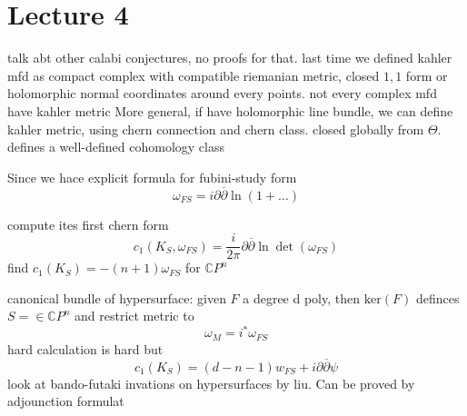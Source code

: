 % 
\section{Lecture 4} %
\label{sec:lecture_4}
talk abt other calabi conjectures, no proofs for that.
last time we defined kahler mfd as compact complex with compatible riemanian metric, closed $1,1$ form
or holomorphic normal coordinates around every points. not every complex mfd have kahler metric
More general, if have holomorphic line bundle, we can define kahler metric, using chern connection and chern class. closed globally from $\Theta$. defines a well-defined cohomology class 

Since we hace explicit formula for fubini-study form
\begin{equation}
    \omega_{FS} = i \partial \overline{\partial} \ln(1 + \ldots)
\end{equation}

compute ites first chern form
\begin{equation}
    c_1(K_S, \omega_{FS}) = \frac{i}{2 \pi} \partial \overline{\partial} \ln \det(\omega_{FS})
\end{equation}
find $c_1(K_S) = -(n+1)\omega_{FS}$ for $\mathbb{C}P^n$


canonical bundle of hypersurface: given $F$ a degree d poly, then $\mathrm{ker}(F)$ definces $S =\in \mathbb{C}P^n$ and restrict metric to
\begin{equation}
    \omega_M= i^*\omega_{FS}
\end{equation}
hard calculation is hard but
\begin{equation}
    c_1(K_S) = (d-n-1)w_{FS} + i \partial \overline{\partial} \psi
\end{equation}
look at bando-futaki invations on hypersurfaces by liu.
Can be proved by adjounction formulat

